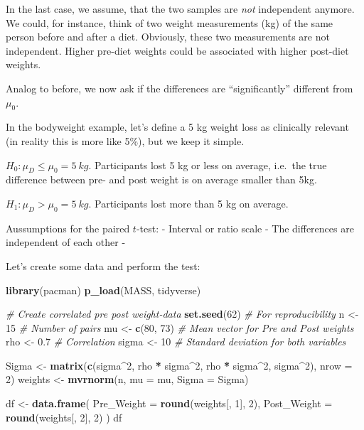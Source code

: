 \documentclass[
]{book}
\newenvironment{Shaded}{\begin{snugshade}}{\end{snugshade}}
\newcommand{\AttributeTok}[1]{\textcolor[rgb]{0.13,0.29,0.53}{#1}}
\newcommand{\CommentTok}[1]{\textcolor[rgb]{0.56,0.35,0.01}{\textit{#1}}}
\newcommand{\DecValTok}[1]{\textcolor[rgb]{0.00,0.00,0.81}{#1}}
\newcommand{\FloatTok}[1]{\textcolor[rgb]{0.00,0.00,0.81}{#1}}
\newcommand{\FunctionTok}[1]{\textcolor[rgb]{0.13,0.29,0.53}{\textbf{#1}}}
\newcommand{\NormalTok}[1]{#1}
\newcommand{\OtherTok}[1]{\textcolor[rgb]{0.56,0.35,0.01}{#1}}
\newcommand{\SpecialCharTok}[1]{\textcolor[rgb]{0.81,0.36,0.00}{\textbf{#1}}}
\begin{document}
In the last case, we assume, that the two samples are \emph{not} independent anymore. We could, for instance,
think of two weight measurements (kg) of the same person before and after a diet. Obviously,
these two measurements are not independent. Higher pre-diet weights could be associated
with higher post-diet weights.

Analog to before, we now ask if the differences are ``significantly'' different from \(\mu_0\).

In the bodyweight example, let's define a 5 kg weight loss as clinically relevant
(in reality this is more like 5\%), but we keep it simple.

\(H_0: \mu_D \le \mu_0 = 5~kg\). Participants lost 5 kg or less on average,
i.e.~the true difference between pre- and post weight is on average smaller than 5kg.

\(H_1: \mu_D > \mu_0 = 5~kg\). Participants lost more than 5 kg on average.

Aussumptions for the paired \(t\)-test:
- Interval or ratio scale
- The differences are independent of each other
-

Let's create some data and perform the test:

\begin{Shaded}
\begin{Highlighting}[]
\FunctionTok{library}\NormalTok{(pacman)}
\FunctionTok{p\_load}\NormalTok{(MASS, tidyverse)}

\CommentTok{\# Create correlated pre post weight{-}data}
\FunctionTok{set.seed}\NormalTok{(}\DecValTok{62}\NormalTok{)  }\CommentTok{\# For reproducibility}
\NormalTok{n }\OtherTok{\textless{}{-}} \DecValTok{15}  \CommentTok{\# Number of pairs}
\NormalTok{mu }\OtherTok{\textless{}{-}} \FunctionTok{c}\NormalTok{(}\DecValTok{80}\NormalTok{, }\DecValTok{73}\NormalTok{)  }\CommentTok{\# Mean vector for Pre and Post weights}
\NormalTok{rho }\OtherTok{\textless{}{-}} \FloatTok{0.7}  \CommentTok{\# Correlation}
\NormalTok{sigma }\OtherTok{\textless{}{-}} \DecValTok{10}  \CommentTok{\# Standard deviation for both variables}

\NormalTok{Sigma }\OtherTok{\textless{}{-}} \FunctionTok{matrix}\NormalTok{(}\FunctionTok{c}\NormalTok{(sigma}\SpecialCharTok{\^{}}\DecValTok{2}\NormalTok{, rho }\SpecialCharTok{*}\NormalTok{ sigma}\SpecialCharTok{\^{}}\DecValTok{2}\NormalTok{, rho }\SpecialCharTok{*}\NormalTok{ sigma}\SpecialCharTok{\^{}}\DecValTok{2}\NormalTok{, sigma}\SpecialCharTok{\^{}}\DecValTok{2}\NormalTok{), }\AttributeTok{nrow =} \DecValTok{2}\NormalTok{)}
\NormalTok{weights }\OtherTok{\textless{}{-}} \FunctionTok{mvrnorm}\NormalTok{(n, }\AttributeTok{mu =}\NormalTok{ mu, }\AttributeTok{Sigma =}\NormalTok{ Sigma)}

\NormalTok{df }\OtherTok{\textless{}{-}} \FunctionTok{data.frame}\NormalTok{(}
  \AttributeTok{Pre\_Weight =} \FunctionTok{round}\NormalTok{(weights[, }\DecValTok{1}\NormalTok{], }\DecValTok{2}\NormalTok{),}
  \AttributeTok{Post\_Weight =} \FunctionTok{round}\NormalTok{(weights[, }\DecValTok{2}\NormalTok{], }\DecValTok{2}\NormalTok{)}
\NormalTok{)}
\NormalTok{df}
\end{Highlighting}
\end{Shaded}
\end{document}
